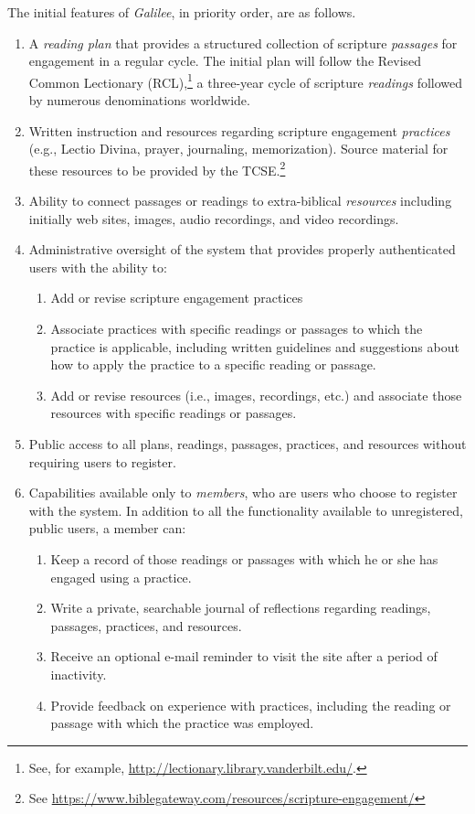 \documentclass{article}
\newcommand{\gal}{\emph{Galilee}}
\begin{document}
The initial features of \gal,
in priority order, are as follows.
\begin{enumerate}
\item A \emph{reading plan}
  that provides a structured collection of scripture \emph{passages}
  for engagement in a regular cycle.
  The initial plan will follow the Revised Common Lectionary
  (RCL),\footnote{See, for example, \url{http://lectionary.library.vanderbilt.edu/}.}
  a three-year cycle of scripture \emph{readings}
  followed by numerous denominations worldwide.
\item Written instruction and resources
  regarding scripture engagement \emph{practices}
  (e.g., Lectio Divina, prayer, journaling, memorization).
  Source material for these resources to be
  provided by
  the TCSE.\footnote{See \url{https://www.biblegateway.com/resources/scripture-engagement/}}
\item Ability to connect passages or readings
  to extra-biblical \emph{resources} including initially
  web sites,
  images,
  audio recordings,
  and video recordings.
\item Administrative oversight of the system
  that provides properly authenticated users
  with the ability to:
  \begin{enumerate}
  \item Add or revise scripture engagement practices
  \item Associate practices with specific readings or passages
    to which the practice is applicable,
    including written guidelines and suggestions
    about how to apply the practice to a specific reading or passage.
  \item Add or revise resources (i.e., images, recordings, etc.)
    and associate those resources with specific readings or passages.
  \end{enumerate}
\item Public access to all plans, readings, passages, practices, and resources
  without requiring users to register.
\item Capabilities available only to \emph{members},
  who are users who choose to register with the system.
  In addition to all the functionality available to
  unregistered, public users, a member can:
  \begin{enumerate}
  \item Keep a record of those readings or passages
    with which he or she has engaged using a practice.
  \item Write a private, searchable journal of reflections
    regarding readings, passages, practices, and resources.
  \item Receive an optional e-mail reminder to visit the site
    after a period of inactivity.
  \item Provide feedback on experience with practices,
    including the reading or passage with which the practice was employed.
  \end{enumerate}
\end{enumerate}
\end{document}
